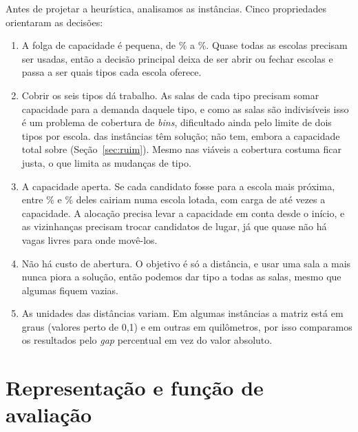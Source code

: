 \documentclass[12pt]{article}
\begin{document}
\begin{table}[htbp]
  \centering
  \caption{Instâncias utilizadas (\emph{Folga}: capacidade total acima do número de candidatos;
    \emph{Viável}: existe solução com um tipo por sala e até dois tipos por escola).}
  \label{tab:instancias}
  \scriptsize
  
\end{table}

Antes de projetar a heurística, analisamos as instâncias. Cinco propriedades orientaram as
decisões:
\begin{enumerate}
  \item A folga de capacidade é pequena, de \folgaMin\% a \folgaMax\%. Quase todas as escolas
    precisam ser usadas, então a decisão principal deixa de ser abrir ou fechar escolas e passa a
    ser quais tipos cada escola oferece.
  \item Cobrir os seis tipos dá trabalho. As salas de cada tipo precisam somar capacidade para a
    demanda daquele tipo, e como as salas são indivisíveis isso é um problema de cobertura de
    \emph{bins}, dificultado ainda pelo limite de dois tipos por escola. \nInst{} das \nTotal{}
    instâncias têm solução; \idInviavel{} não tem, embora a capacidade total sobre
    (Seção~\ref{sec:ruim}). Mesmo nas viáveis a cobertura costuma ficar justa, o que limita as
    mudanças de tipo.
  \item A capacidade aperta. Se cada candidato fosse para a escola mais próxima, entre
    \fracSobreMin\% e \fracSobreMax\% deles cairiam numa escola lotada, com carga de até
    \sobrecargaMax{} vezes a capacidade. A alocação precisa levar a capacidade em conta desde o
    início, e as vizinhanças precisam trocar candidatos de lugar, já que quase não há vagas livres
    para onde movê-los.
  \item Não há custo de abertura. O objetivo é só a distância, e usar uma sala a mais nunca piora a
    solução, então podemos dar tipo a todas as salas, mesmo que algumas fiquem vazias.
  \item As unidades das distâncias variam. Em algumas instâncias a matriz está em graus (valores
    perto de 0,1) e em outras em quilômetros, por isso comparamos os resultados pelo \emph{gap}
    percentual em vez do valor absoluto.
\end{enumerate}

\section{Representação e função de avaliação}\label{sec:representacao}
\end{document}
